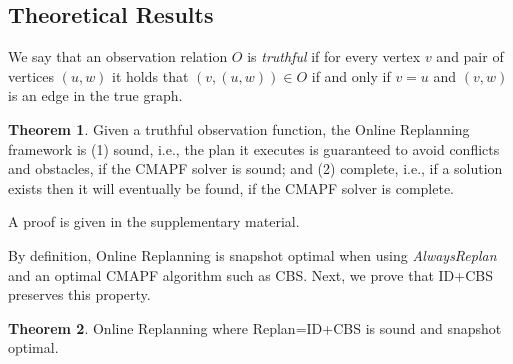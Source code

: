 \documentclass[letterpaper]{article} %
\def\
UrlFont{\rm}  %
\newcommand{\roni}[1]{\textbf{[\color{orange}RONI:#1]}}
\theoremstyle{definition}
\newtheorem{theorem}{Theorem}
\begin{document}

\subsection{Theoretical Results}

We say that an observation relation $O$ is \emph{truthful} if for every vertex $v$ and pair of vertices $(u,w)$ it holds that $(v,(u,w))\in O$ if and only if $v=u$ and $(v,w)$ is an edge in the true graph. 
\begin{theorem}
Given a truthful observation function, 
the Online Replanning framework is (1) sound, i.e., the plan it executes is guaranteed to avoid conflicts and obstacles, if the CMAPF solver is sound; and (2) complete, i.e., if a solution exists then it will eventually be found, if the CMAPF solver is complete.
\end{theorem}
\noindent A proof is given in the supplementary material. 


By definition, Online Replanning is snapshot optimal when using \emph{AlwaysReplan} and an optimal CMAPF algorithm such as CBS. 
Next, we prove that ID+CBS preserves this property.
\begin{theorem}
   Online Replanning where Replan=ID+CBS is sound and snapshot optimal.
\end{theorem}
\end{document}
